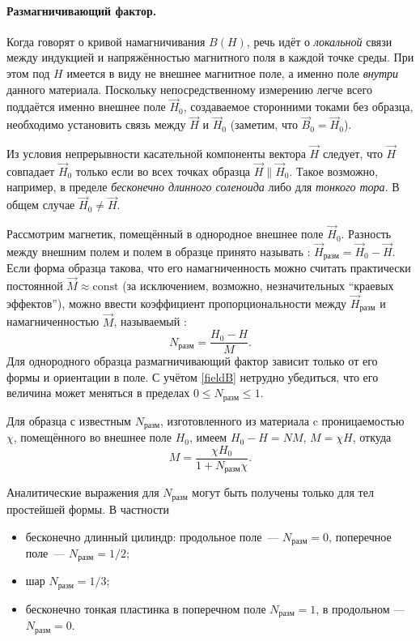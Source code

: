 
\paragraph{Размагничивающий фактор.}
Когда говорят о кривой намагничивания $B(H)$,
речь идёт о \emph{локальной} связи между
индукцией и напряжённостью магнитного поля в каждой точке среды.
При этом под $H$ имеется в виду не внешнее магнитное поле,
а именно поле \emph{внутри} данного материала. Поскольку непосредственному
измерению легче всего поддаётся именно внешнее поле $\vec{H}_{0}$,
создаваемое сторонними токами без образца, необходимо установить связь
между $\vec{H}$ и $\vec{H}_0$ (заметим, что $\vec{B}_0=\vec{H}_0$).

Из условия непрерывности касательной компоненты вектора $\vec{H}$ следует,
что $\vec{H}$ совпадает $\vec{H}_{0}$ только если во всех точках образца
$\vec{H} \parallel \vec{H}_{0}$.
Такое возможно, например, в пределе \emph{бесконечно длинного соленоида} либо
для \emph{тонкого тора}.
В общем случае $\vec{H}_0 \ne \vec{H}$.

Рассмотрим магнетик, помещённый в однородное внешнее поле $\vec{H}_0$.
Разность между внешним полем и полем в образце принято называть
:
$\vec{H}_{разм} = \vec{H}_0 - \vec{H}$.
Если форма образца такова, что его намагниченность можно считать
практически постоянной $\vec{M}\approx\mathrm{const}$ (за исключением,
возможно, незначительных ``краевых эффектов''), можно ввести
коэффициент пропорциональности между $\vec{H}_{разм}$ и намагниченностью $\vec{M}$,
называемый :
\[
N_{разм} = \frac{H_0-H}{M}.
\]
Для однородного образца размагничивающий фактор зависит
только от его формы и ориентации в поле.
С учётом \eqref{fieldB} нетрудно убедиться, что его величина может меняться в пределах $0\le N_{разм} \le 1$.

Для образца с известным $N_{разм}$, изготовленного из материала
c проницаемостью $\chi$, помещённого во внешнее поле $H_0$, имеем
$H_0 - H = N M$, $M=\chi H$, откуда
\[
M = \frac{\chi H_0}{1+N_{разм}\chi}.
\]

Аналитические выражения для $N_{разм}$ могут быть получены только для тел
простейшей формы. В частности
\begin{itemize}
    \item бесконечно длинный цилиндр: продольное поле~--- $N_{разм} = 0$,
          поперечное поле~--- $N_{разм} = 1/2$;
    \item шар $N_{разм} = 1/3$;
    \item бесконечно тонкая пластинка в поперечном поле $N_{разм} = 1$,
          в продольном --- $N_{разм} = 0$.
\end{itemize}

